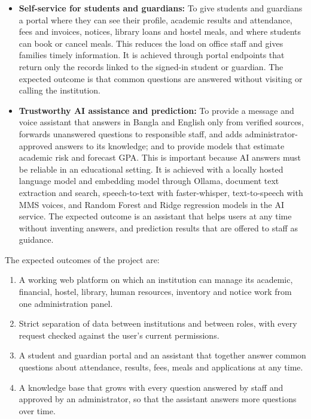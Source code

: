 \begin{itemize}
    \item \textbf{Self-service for students and guardians:} To give students and guardians a portal where they can see their profile, academic results and attendance, fees and invoices, notices, library loans and hostel meals, and where students can book or cancel meals. This reduces the load on office staff and gives families timely information. It is achieved through portal endpoints that return only the records linked to the signed-in student or guardian. The expected outcome is that common questions are answered without visiting or calling the institution.

    \item \textbf{Trustworthy AI assistance and prediction:} To provide a message and voice assistant that answers in Bangla and English only from verified sources, forwards unanswered questions to responsible staff, and adds administrator-approved answers to its knowledge; and to provide models that estimate academic risk and forecast GPA. This is important because AI answers must be reliable in an educational setting. It is achieved with a locally hosted language model and embedding model through Ollama, document text extraction and search, speech-to-text with faster-whisper, text-to-speech with MMS voices, and Random Forest and Ridge regression models in the AI service. The expected outcome is an assistant that helps users at any time without inventing answers, and prediction results that are offered to staff as guidance.
\end{itemize}

The expected outcomes of the project are:
\begin{enumerate}
    \item A working web platform on which an institution can manage its academic, financial, hostel, library, human resources, inventory and notice work from one administration panel.

    \item Strict separation of data between institutions and between roles, with every request checked against the user's current permissions.

    \item A student and guardian portal and an assistant that together answer common questions about attendance, results, fees, meals and applications at any time.

    \item A knowledge base that grows with every question answered by staff and approved by an administrator, so that the assistant answers more questions over time.
\end{enumerate}


